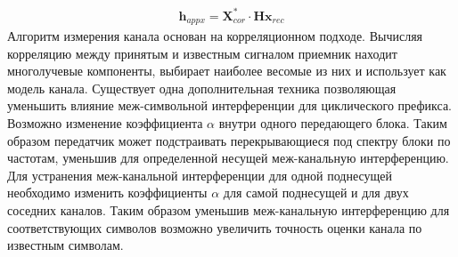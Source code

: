 \begin{align}
\mathbf{h}_{appx}=\mathbf{X}_{cor}^*\cdot \mathbf{H}\mathbf{x}_{rec}\label{siso_a_11}
\end{align}
Алгоритм измерения канала основан на корреляционном подходе. Вычисляя корреляцию между принятым и известным сигналом приемник находит многолучевые компоненты, выбирает наиболее весомые из них и использует как модель канала. 
Существует одна дополнительная техника позволяющая уменьшить влияние  меж-символьной интерференции для циклического префикса. Возможно изменение коэффициента $\alpha$ внутри одного передающего блока. Таким образом передатчик может подстраивать перекрывающиеся под спектру блоки по частотам, уменьшив для определенной несущей меж-канальную интерференцию. Для устранения меж-канальной интерференции для одной поднесущей необходимо изменить коэффициенты $\alpha$ для самой поднесущей и для двух соседних каналов. Таким образом уменьшив меж-канальную интерференцию для соответствующих символов возможно увеличить точность оценки канала по известным символам.

